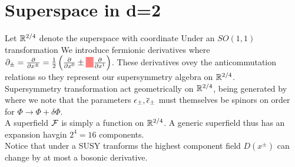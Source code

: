\documentclass{article}
\begin{document}
\section{Superspace in d=2}
Let $\mathbb{R}^{2/4}$ denote the superspace with coordinate 
Under an $SO(1,1)$ transformation 
We introduce fermionic derivatives
where $\del_\pm = \pd{x^\pm} = \frac{1}{2}\pround{\pd{x^0} \pm \highlight{\phantom{i}} \pd{x^1}}$. These derivatives ovey the anticommutation relations 
so they represent our supersymmetry algebra on $\mathbb{R}^{2/4}$. \\
Supersymmetry transformation act geometrically on $\mathbb{R}^{2/4}$, being generated by 
where we note that the parameters $\epsilon_\pm, \overline{\epsilon}_\pm$ must themselves be spinors on order for $\Phi \to \Phi + \delta \Phi$. \\
A superfield $\mathcal{F}$ is simply a function on $\mathbb{R}^{2/4}$. A generic superfield thus has an expansion 
havgin $2^4 = 16$ components.\\
Notice that under a SUSY tranforms 
the highest component field $D(x^\pm)$ can change by at most a bosonic derivative. 
\end{document}
